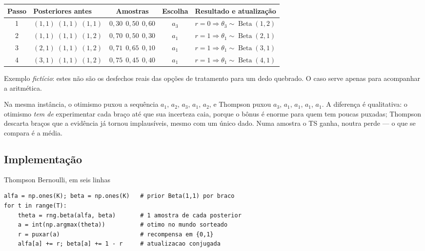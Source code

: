 \documentclass[11pt, a4paper]{article}
\newcommand{\Bdist}{\operatorname{Beta}}
\begin{document}
\begin{center}\small
\begin{tabular}{@{}clccl@{}}
\toprule
\textbf{Passo} & \textbf{Posteriores antes} & \textbf{Amostras} & \textbf{Escolha} & \textbf{Resultado e atualização} \\
\midrule
1 & $(1,1)\;(1,1)\;(1,1)$ & $0{,}30\ \ 0{,}50\ \ 0{,}60$ & $a_3$ & $r=0 \Rightarrow \theta_3 \sim \Bdist(1,2)$ \\
2 & $(1,1)\;(1,1)\;(1,2)$ & $0{,}70\ \ 0{,}50\ \ 0{,}30$ & $a_1$ & $r=1 \Rightarrow \theta_1 \sim \Bdist(2,1)$ \\
3 & $(2,1)\;(1,1)\;(1,2)$ & $0{,}71\ \ 0{,}65\ \ 0{,}10$ & $a_1$ & $r=1 \Rightarrow \theta_1 \sim \Bdist(3,1)$ \\
4 & $(3,1)\;(1,1)\;(1,2)$ & $0{,}75\ \ 0{,}45\ \ 0{,}40$ & $a_1$ & $r=1 \Rightarrow \theta_1 \sim \Bdist(4,1)$ \\
\bottomrule
\end{tabular}
\end{center}

\begin{alertabox}
Exemplo \emph{fictício}: estes não são os desfechos reais das opções de
tratamento para um dedo quebrado. O caso serve apenas para acompanhar a
aritmética.
\end{alertabox}

Na mesma instância, o otimismo puxou a sequência
$a_1$, $a_2$, $a_3$, $a_1$, $a_2$, e Thompson puxou
$a_3$, $a_1$, $a_1$, $a_1$, $a_1$. A diferença é qualitativa: o otimismo
\emph{tem de} experimentar cada braço até que sua incerteza caia, porque o
bônus é enorme para quem tem poucas puxadas; Thompson descarta braços que a
evidência já tornou implausíveis, mesmo com um único dado. Numa amostra o TS
ganha, noutra perde — o que se compara é a média.

\subsection*{Implementação}

\begin{algbox}{Thompson Bernoulli, em seis linhas}
\begin{verbatim}
alfa = np.ones(K); beta = np.ones(K)   # prior Beta(1,1) por braco
for t in range(T):
    theta = rng.beta(alfa, beta)       # 1 amostra de cada posterior
    a = int(np.argmax(theta))          # otimo no mundo sorteado
    r = puxar(a)                       # recompensa em {0,1}
    alfa[a] += r; beta[a] += 1 - r     # atualizacao conjugada
\end{verbatim}
\end{algbox}
\end{document}
